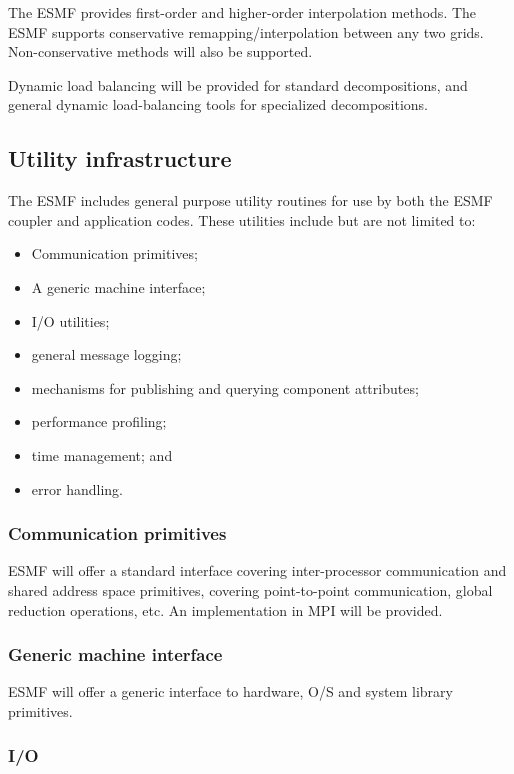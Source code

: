 The ESMF provides first-order and higher-order interpolation 
methods.  The ESMF supports conservative remapping/interpolation 
between any two grids. Non-conservative methods will also 
be supported.

Dynamic load balancing will be provided for standard decompositions, 
and general dynamic load-balancing tools for specialized decompositions.

\subsection{Utility infrastructure}

The ESMF includes general purpose utility routines for use by both 
the ESMF coupler and application codes.  These utilities include 
but are not limited to:
\begin{itemize}
\item Communication primitives;
\item A generic machine interface;
\item I/O utilities;
\item general message logging;
\item mechanisms for publishing and querying component attributes;
\item performance profiling;
\item time management; and
\item error handling.
\end{itemize}

\subsubsection{Communication primitives}

ESMF will offer a standard interface covering inter-processor
communication and shared address space primitives, covering
point-to-point communication, global reduction operations, etc. An
implementation in MPI will be provided.

\subsubsection{Generic machine interface}

ESMF will offer a generic interface to hardware, O/S and system
library primitives.

\subsubsection{I/O}

